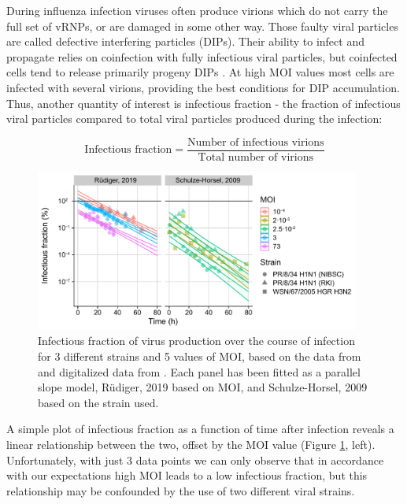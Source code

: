 During influenza infection viruses often produce virions which do not carry the full set of vRNPs, or are damaged in some other way. Those faulty viral particles are called defective interfering particles (DIPs). Their ability to infect and propagate relies on coinfection with fully infectious viral particles, but coinfected cells tend to release primarily progeny DIPs \cite{frensing2014impact}. At high MOI values most cells are infected with several virions, providing the best conditions for DIP accumulation. Thus, another quantity of interest is infectious fraction - the fraction of infectious viral particles compared to total viral particles produced during the infection:

\begin{equation}
    \text{Infectious fraction} = \frac{\text{Number of infectious virions}}{\text{Total number of virions}}
\end{equation}

\begin{figure}
\begin{center}
\includegraphics[width=0.95\textwidth, trim={0cm 0cm 0cm 0cm}, clip]{D_chapters/3_DARPinModels/InfectiousFractionAll.pdf}
\caption[Infectious fraction of virus production over the course of infection]%
{Infectious fraction of virus production over the course of infection for 3 different strains and 5 values of MOI, based on the data from \cite{frensing2016influenza, rudiger2019multiscale} and digitalized data from \cite{schulze2009infection}. Each panel has been fitted as a parallel slope model, R\"udiger, 2019 \cite{rudiger2019multiscale} based on MOI, and Schulze-Horsel, 2009 \cite{schulze2009infection} based on the strain used.}
\label{figure:infectiousFraction}
\end{center}
\end{figure}

A simple plot of infectious fraction \cite{rudiger2019multiscale, frensing2016influenza} as a function of time after infection reveals a linear relationship between the two, offset by the MOI value (Figure \ref{figure:infectiousFraction}, left). Unfortunately, with just 3 data points we can only observe that in accordance with our expectations high MOI leads to a low infectious fraction, but this relationship may be confounded by the use of two different viral strains.

